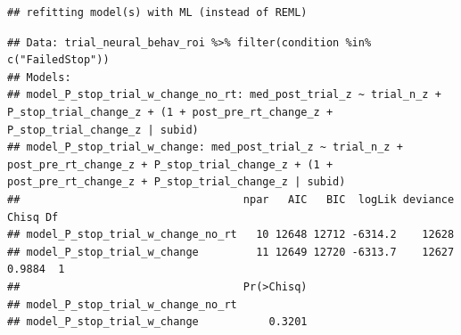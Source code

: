 \documentclass[
]{article}
\newenvironment{Shaded}{\begin{snugshade}}{\end{snugshade}}
\newcommand{\CommentTok}[1]{\textcolor[rgb]{0.56,0.35,0.01}{\textit{#1}}}
\newcommand{\DecValTok}[1]{\textcolor[rgb]{0.00,0.00,0.81}{#1}}
\newcommand{\KeywordTok}[1]{\textcolor[rgb]{0.13,0.29,0.53}{\textbf{#1}}}
\newcommand{\NormalTok}[1]{#1}
\newcommand{\OperatorTok}[1]{\textcolor[rgb]{0.81,0.36,0.00}{\textbf{#1}}}
\newcommand{\StringTok}[1]{\textcolor[rgb]{0.31,0.60,0.02}{#1}}
\begin{document}
\begin{verbatim}
## refitting model(s) with ML (instead of REML)
\end{verbatim}

\begin{verbatim}
## Data: trial_neural_behav_roi %>% filter(condition %in% c("FailedStop"))
## Models:
## model_P_stop_trial_w_change_no_rt: med_post_trial_z ~ trial_n_z + P_stop_trial_change_z + (1 + post_pre_rt_change_z + P_stop_trial_change_z | subid)
## model_P_stop_trial_w_change: med_post_trial_z ~ trial_n_z + post_pre_rt_change_z + P_stop_trial_change_z + (1 + post_pre_rt_change_z + P_stop_trial_change_z | subid)
##                                   npar   AIC   BIC  logLik deviance  Chisq Df
## model_P_stop_trial_w_change_no_rt   10 12648 12712 -6314.2    12628          
## model_P_stop_trial_w_change         11 12649 12720 -6313.7    12627 0.9884  1
##                                   Pr(>Chisq)
## model_P_stop_trial_w_change_no_rt           
## model_P_stop_trial_w_change           0.3201
\end{verbatim}

\begin{Shaded}
\end{Shaded}
\end{document}

